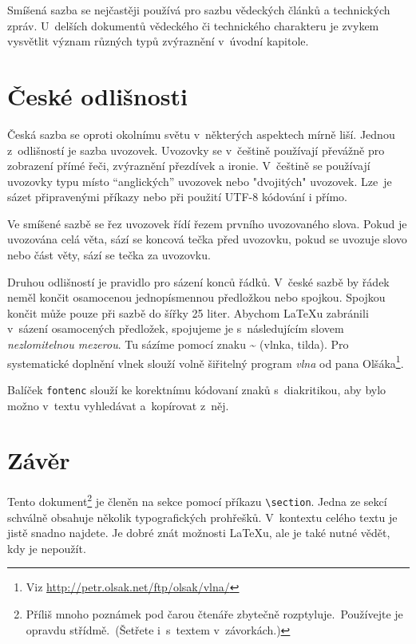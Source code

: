 \documentclass[a4paper,10pt,twocolumn]{article}
\begin{document}
Smíšená sazba se nejčastěji používá pro sazbu vě\-dec\-kých článků a technických zpráv. U~delších dokumentů vědeckého či technického charakteru je zvykem vy\-svět\-lit význam různých typů zvýraznění v~úvodní kapitole.

\section{České odlišnosti}

Česká sazba se oproti okolnímu světu v~některých aspektech mírně liší. Jednou z~odlišností je sazba uvozovek. Uvozovky se v~češtině používají převážně pro zobrazení přímé řeči, zvýraznění přezdívek a ironie. V~češtině se používají uvozovky typu  místo ``an\-gli\-ckých'' uvozovek nebo "dvojitých" uvozovek. Lze~je sázet připravenými příkazy nebo při použití UTF-8 kó\-do\-vá\-ní i přímo.

Ve smíšené sazbě se řez uvozovek řídí řezem prvního uvozovaného slova. Pokud je uvozována celá věta, sází se koncová tečka před uvozovku, pokud se uvozuje slovo nebo část věty, sází se tečka za uvozovku.

Druhou odlišností je pravidlo pro sázení konců řádků. V~české sazbě by řádek neměl končit osamocenou jednopísmennou předložkou nebo spojkou. Spojkou  končit může pouze při sazbě do šířky 25 liter. Abychom \LaTeX u zabránili v~sázení osamocených předložek, spojujeme je s~následujícím slovem \textit{nezlomitelnou mezerou}. Tu sázíme pomocí znaku \textbf{\~{}} (vlnka, tilda). Pro systematické doplnění vlnek slouží volně šiřitelný program \textit{vlna} od pana Olšáka\footnote{Viz \url{http://petr.olsak.net/ftp/olsak/vlna/}}.

Balíček \verb|fontenc| slouží ke korektnímu kódovaní znaků s~diakritikou, aby bylo možno v~textu vyhledávat a~kopírovat z~něj.

\section{Závěr}

Tento dokument\footnote{Příliš mnoho poznámek pod čarou čtenáře zbytečně rozptyluje.\ Používejte je opravdu střídmě.\ (Šetřete i~s~textem v~závorkách.)} je členěn na sekce pomocí příkazu \verb|\section|. Jedna ze sekcí schválně obsahuje několik typografických prohřešků. V~kontextu celého textu je jistě snadno najdete. Je dobré znát možnosti \LaTeX u, ale je také nutné vědět, kdy je nepoužít.
\end{document}
